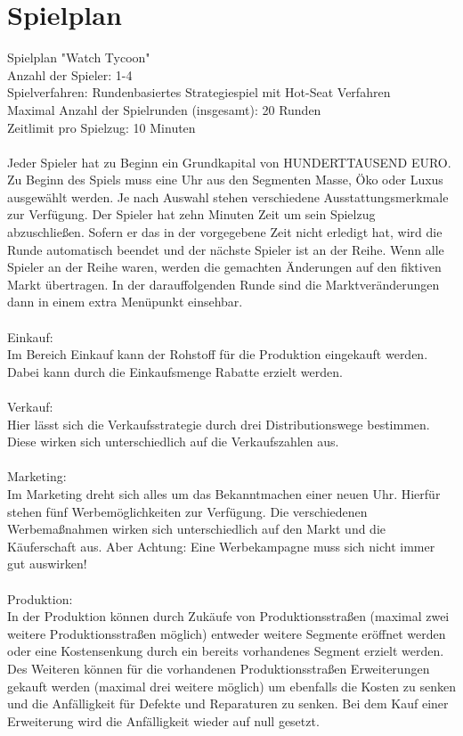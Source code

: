 \clearpage
\chapter{Spielplan}
Spielplan "Watch Tycoon" \\
Anzahl der Spieler: 1-4 \\
Spielverfahren: Rundenbasiertes Strategiespiel mit Hot-Seat Verfahren \\
Maximal Anzahl der Spielrunden (insgesamt): 20 Runden \\
Zeitlimit pro Spielzug: 10 Minuten \\
\\
Jeder Spieler hat zu Beginn ein Grundkapital von HUNDERTTAUSEND EURO. Zu Beginn des Spiels muss eine Uhr aus den Segmenten Masse, Öko oder Luxus ausgewählt werden. Je nach Auswahl stehen verschiedene Ausstattungsmerkmale zur Verfügung. Der Spieler hat zehn Minuten Zeit um sein Spielzug abzuschließen. Sofern er das in der vorgegebene Zeit nicht erledigt hat, wird die Runde automatisch beendet und der nächste Spieler ist an der Reihe. Wenn alle Spieler an der Reihe waren, werden die gemachten Änderungen auf den fiktiven Markt übertragen. In der darauffolgenden Runde sind die Marktveränderungen dann in einem extra Menüpunkt einsehbar. \\ 
\\
Einkauf:\\
Im Bereich Einkauf kann der Rohstoff für die Produktion eingekauft werden. Dabei kann durch die Einkaufsmenge Rabatte erzielt werden. \\
\\
Verkauf: \\
Hier lässt sich die Verkaufsstrategie durch drei Distributionswege bestimmen. Diese wirken sich unterschiedlich auf die Verkaufszahlen aus.\\
\\
Marketing:\\
Im Marketing dreht sich alles um das Bekanntmachen einer neuen Uhr. Hierfür stehen fünf Werbemöglichkeiten zur Verfügung. Die verschiedenen Werbemaßnahmen wirken sich unterschiedlich auf den Markt und die Käuferschaft aus. Aber Achtung: Eine Werbekampagne muss sich nicht immer gut auswirken!\\ 
\\
Produktion: \\
In der Produktion können durch Zukäufe von Produktionsstraßen (maximal zwei weitere Produktionsstraßen möglich) entweder weitere Segmente eröffnet werden oder eine Kostensenkung durch ein bereits vorhandenes Segment erzielt werden. Des Weiteren können für die vorhandenen Produktionsstraßen Erweiterungen gekauft werden (maximal drei weitere möglich) um ebenfalls die Kosten zu senken und die Anfälligkeit für Defekte und Reparaturen zu senken. Bei dem Kauf einer Erweiterung wird die Anfälligkeit wieder auf null gesetzt. \\ 
